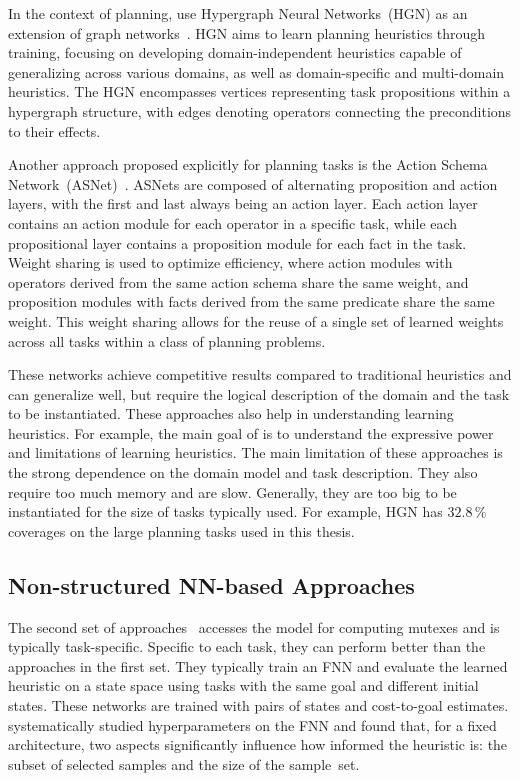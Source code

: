 In the context of planning, \citet{shen2020learning} use Hypergraph Neural Networks~(HGN) as an extension of graph networks~\cite{battaglia2018relational}. HGN aims to learn planning heuristics through training, focusing on developing domain-independent heuristics capable of generalizing across various domains, as well as domain-specific and multi-domain heuristics. The HGN encompasses vertices representing task propositions within a hypergraph structure, with edges denoting operators connecting the preconditions to their effects.

Another approach proposed explicitly for planning tasks is the Action Schema Network~(ASNet)~\cite{toyer2018action}. ASNets are composed of alternating proposition and action layers, with the first and last always being an action layer. Each action layer contains an action module for each operator in a specific task, while each propositional layer contains a proposition module for each fact in the task. Weight sharing is used to optimize efficiency, where action modules with operators derived from the same action schema share the same weight, and proposition modules with facts derived from the same predicate share the same weight. This weight sharing allows for the reuse of a single set of learned weights across all tasks within a class of planning problems.

These networks achieve competitive results compared to traditional heuristics and can generalize well, but require the logical description of the domain and the task to be instantiated. These approaches also help in understanding learning heuristics. For example, the main goal of \citet{stahlberg2022learning} is to understand the expressive power and limitations of learning heuristics. The main limitation of these approaches is the strong dependence on the domain model and task description. They also require too much memory and are slow. Generally, they are too big to be instantiated for the size of tasks typically used. For example, HGN has $32.8\,\%$ coverages on the large planning tasks used in this thesis.

\subsection{Non-structured NN-based Approaches}
\label{sec:related-work-sample-based}

The second set of approaches~\cite{ferber2020neural, yu2020learning, ferber2022neural, otoole2022sampling} accesses the model for computing mutexes and is typically task-specific. Specific to each task, they can perform better than the approaches in the first set. They typically train an FNN and evaluate the learned heuristic on a state space using tasks with the same goal and different initial states. These networks are trained with pairs of states and cost-to-goal estimates. \citet{ferber2020neural} systematically studied hyperparameters on the FNN and found that, for a fixed architecture, two aspects significantly influence how informed the heuristic is: the subset of selected samples and the size of the sample~set.

